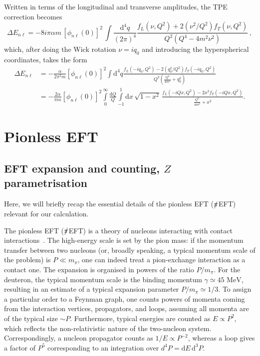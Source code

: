 \documentclass[prl,
twocolumn,
showpacs,preprintnumbers,amsmath,amssymb,
superscriptaddress,
a4paper,nofootinbib,longbibliography]{revtex4-2}
\def\al{\alpha}
\def\dd{\mathrm{d}}
\def\piEFT/{$\slashed{\pi}$EFT}
\begin{document}
Written in terms of the longitudinal and transverse amplitudes, the TPE correction becomes
\begin{equation}
\Delta E_{n\ell}= -8i\pi \al m \,\left[\phi_{n\ell}(0)\right]^2\,
\int \!\!\frac{\dd^4 q}{(2\pi)^4}   \frac{f_L(\nu,Q^2)+2(\nu^2/Q^2)f_T(\nu,Q^2)}{Q^2(Q^4-4m^2\nu^2)}\,,
\label{eq:TPE_LT}
\end{equation}
which, after doing the Wick rotation $\nu = iq_0$ and introducing the hyperspherical coordinates, takes the form
\begin{align}
\Delta E_{n\ell}&=-
\frac{\alpha}{2\pi^2 m}\left[\phi_{n\ell}(0)\right]^2
\int \mathrm{d}^4 q
\frac{f_L(-iq_0,Q^2)-2(q_0^2/Q^2) f_T(-iq_0,Q^2)}{Q^2
\left(\frac{Q^4}{4m^2}+q_0^2\right)}\\
&=-\frac{2\alpha}{\pi m}\left[\phi_{n\ell}(0)\right]^2
\int\limits_0^\infty\frac{\mathrm{d}Q}{Q}\int\limits_{-1}^{1} \mathrm{d}x\,\sqrt{1-x^2}\,
\frac{f_L(-iQx,Q^2)-2x^2 f_T(-iQx,Q^2)}{
\frac{Q^2}{4m^2}+x^2}.
\label{eq:LS_from_LT}
\end{align}


\section{Pionless EFT}



\subsection{EFT expansion and counting, $Z$ parametrisation}
Here, we will briefly recap the essential details of the pionless EFT (\piEFT/) relevant for our calculation.

The pionless EFT (\piEFT/) is a theory of nucleons interacting with contact interactions~\cite{Chen:1999tn,Kaplan:1996xu,Kaplan:1998we,Kaplan:1998tg}. The high-energy scale is set by the pion mass: if the momentum transfer between two nucleons (or, broadly speaking, a typical momentum scale of the problem) is $P\ll m_\pi$, one can indeed treat a pion-exchange interaction as a contact one. The expansion is organised in powers of the ratio $P/m_\pi$. For the deuteron, the typical momentum scale is the binding momentum $\gamma\simeq 45\text{ MeV}$, resulting in an estimate of a typical expansion parameter $P/m_\pi\simeq 1/3$. To assign a particular order to a Feynman graph, one counts powers of momenta coming from the interaction vertices, propagators, and loops, assuming all momenta are of the typical size $\sim P$. Furthermore, typical energies are counted as $E\propto P^2$, which reflects the non-relativistic nature of the two-nucleon system. Correspondingly, a nucleon propagator counts as $1/E\propto P^{-2}$, whereas a loop gives a factor of $P^5$ corresponding to an integration over $d^4P=\mathrm{d}E\, \mathrm{d}^3P$.
\end{document}
